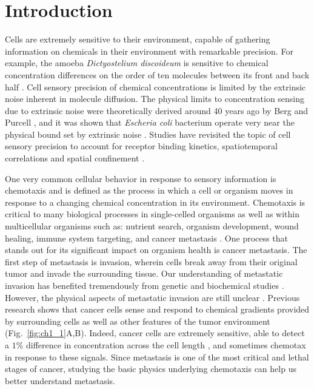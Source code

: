 
\chapter{Introduction}

\noindent
Cells are extremely sensitive to their environment, capable of gathering information on chemicals in their environment with remarkable precision. For example, the amoeba \textit{Dictyostelium discoideum} is sensitive to chemical concentration differences on the order of ten molecules between its front and back half \cite{song2006dictyostelium}. Cell sensory precision of chemical concentrations is limited by the extrinsic noise inherent in molecule diffusion. The physical limits to concentration sensing due to extrinsic noise were theoretically derived around 40 years ago by Berg and Purcell \cite{berg1977physics}, and it was shown that \textit{Escheria coli} bacterium operate very near the physical bound set by extrinsic noise \cite{lan2012energy}. Studies have revisited the topic of cell sensory precision to account for receptor binding kinetics, spatiotemporal correlations and spatial confinement
\cite{bialek2005physical, kaizu2014berg, bicknell2015limits}.

One very common cellular behavior in response to sensory information is chemotaxis and is defined as the process in which a cell or organism moves in response to a changing chemical concentration in its environment. Chemotaxis is critical to many biological processes in single-celled organisms as well as within multicellular organisms such as: nutrient search, organism development, wound healing, immune system targeting, and cancer metastasis \cite{iglesias2008navigating,roussos2011chemotaxis}.
One process that stands out for its significant impact on organism health is cancer metastasis. The first step of metastasis is invasion, wherein cells break away from their original tumor and invade the surrounding tissue. Our understanding of metastatic invasion has benefited tremendously from genetic and biochemical studies \cite{leber2009molecular, hanahan2000hallmarks, hanahan2011hallmarks}. However, the physical aspects of metastatic invasion are still unclear \cite{hanahan2011hallmarks}. Previous research shows that cancer cells sense and respond to chemical gradients provided by surrounding cells
\cite{bhowmick2004stromal, condeelis2006macrophages, shields2007autologous, puliafito2015three} as well as other features of the tumor environment
\cite{shields2007autologous, polacheck2011interstitial, shieh2011regulation} (Fig.\ \ref{fig:ch1_1}A,B). Indeed, cancer cells are extremely sensitive, able to detect a $1\%$ difference in concentration across the cell length
\cite{shields2007autologous}, and sometimes chemotax in response to these signals. Since metastasis is one of the most critical and lethal stages of cancer, studying the basic physics underlying chemotaxis can help us better understand metastasis.

